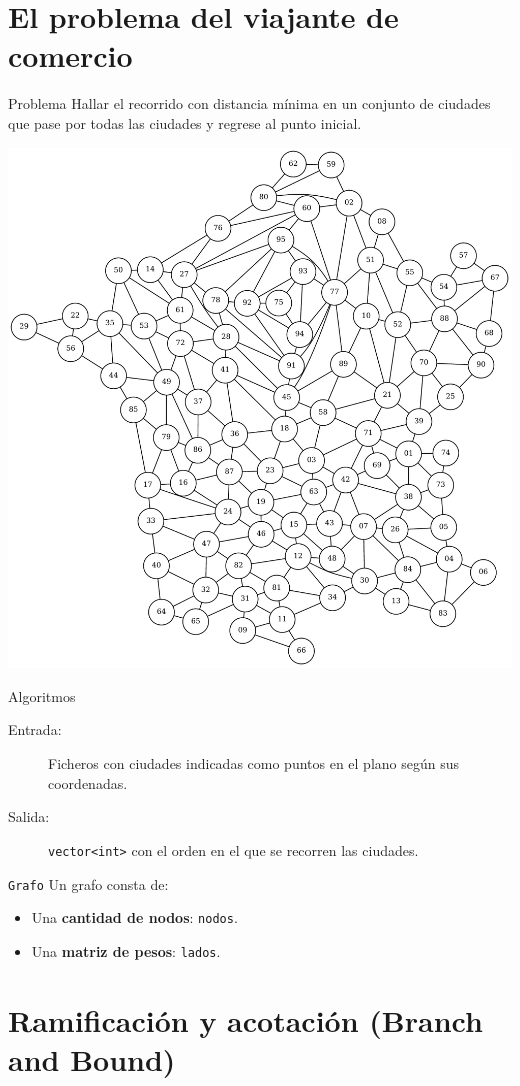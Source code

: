 \section{El problema del viajante de comercio}

\begin{frame}{Problema}
Hallar el recorrido con distancia mínima en un conjunto de
ciudades que pase por todas las ciudades y regrese al punto inicial.

\includegraphics[width=.5\textwidth]{img/Francia} \centering
\end{frame}

\begin{frame}{Algoritmos}
\begin{description}
 \item[Entrada:] Ficheros con ciudades indicadas como puntos en el plano según sus
 coordenadas.
 \item[Salida:] \texttt{vector<int>} con el orden en el que se recorren las ciudades.
\end{description}
\end{frame}


\begin{frame}{\texttt{Grafo}}
Un grafo consta de:

\begin{itemize}
  \item Una \textbf{cantidad de nodos}: \texttt{nodos}.
  \item Una \textbf{matriz de pesos}: \texttt{lados}.
\end{itemize}
\end{frame}

\section{Ramificación y acotación (Branch and Bound)}

